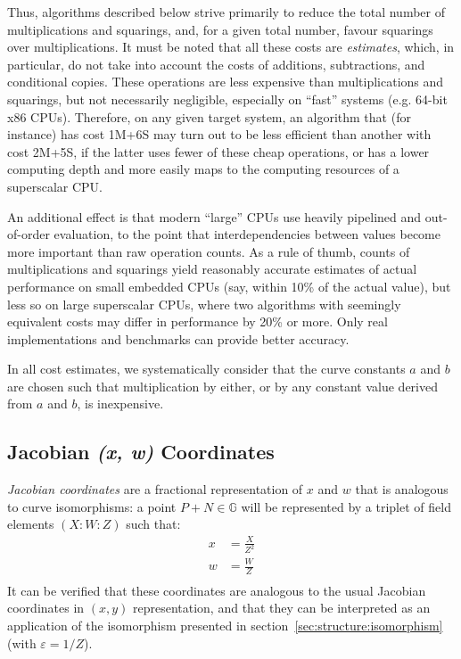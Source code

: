 \documentclass{llncs}
\newcommand{\bG}{\mathbb{G}}
\begin{document}
Thus, algorithms described below strive primarily to reduce the total
number of multiplications and squarings, and, for a given total number,
favour squarings over multiplications. It must be noted that all these
costs are \emph{estimates}, which, in particular, do not take into
account the costs of additions, subtractions, and conditional copies.
These operations are less expensive than multiplications and squarings,
but not necessarily negligible, especially on ``fast'' systems (e.g.
64-bit x86 CPUs). Therefore, on any given target system, an algorithm
that (for instance) has cost 1M+6S may turn out to be less efficient
than another with cost 2M+5S, if the latter uses fewer of these cheap
operations, or has a lower computing depth and more easily maps to the
computing resources of a superscalar CPU.

An additional effect is that modern ``large'' CPUs use heavily pipelined
and out-of-order evaluation, to the point that interdependencies between
values become more important than raw operation counts. As a rule of
thumb, counts of multiplications and squarings yield reasonably accurate
estimates of actual performance on small embedded CPUs (say, within 10\%
of the actual value), but less so on large superscalar CPUs, where two
algorithms with seemingly equivalent costs may differ in performance by
20\% or more. Only real implementations and benchmarks can provide
better accuracy.

In all cost estimates, we systematically consider that the curve
constants $a$ and $b$ are chosen such that multiplication by either, or
by any constant value derived from $a$ and $b$, is inexpensive.

\subsection{Jacobian \emph{(x, w)} Coordinates}\label{sec:algorithms:xwJ}

\emph{Jacobian coordinates} are a fractional representation of $x$ and
$w$ that is analogous to curve isomorphisms: a point $P+N \in \bG$ will
be represented by a triplet of field elements $(X{:}W{:}Z)$ such that:
\begin{align*}
    x &= \frac{X}{Z^2} \\
    w &= \frac{W}{Z} \\
\end{align*}
It can be verified that these coordinates are analogous to the usual
Jacobian coordinates in $(x,y)$ representation, and that they can be
interpreted as an application of the isomorphism presented in
section~\ref{sec:structure:isomorphism} (with $\varepsilon = 1/Z$).
\end{document}
